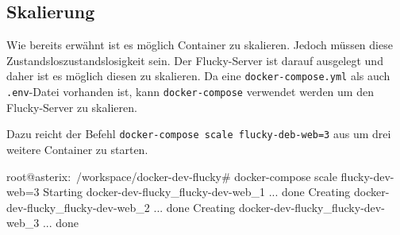 \subsection{Skalierung}%
\label{sec:docker-compose.skalierung}
Wie bereits erwähnt ist es möglich Container zu skalieren. Jedoch müssen diese Zustandslos\footnotesize{zustandslosigkeit} sein. Der Flucky-Server ist darauf ausgelegt und daher ist es möglich diesen zu skalieren. Da eine \texttt{docker-compose.yml} als auch \texttt{.env}-Datei vorhanden ist, kann \texttt{docker-compose} verwendet werden um den Flucky-Server zu skalieren.

Dazu reicht der Befehl \texttt{docker-compose scale flucky-deb-web=3} aus um drei weitere Container zu starten.

\begin{bashcode}
  root@asterix:~/workspace/docker-dev-flucky# docker-compose scale flucky-dev-web=3
  Starting docker-dev-flucky_flucky-dev-web_1 ... done
  Creating docker-dev-flucky_flucky-dev-web_2 ... done
  Creating docker-dev-flucky_flucky-dev-web_3 ... done
\end{bashcode}